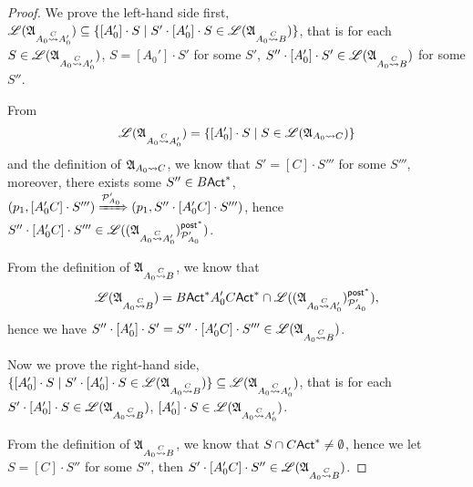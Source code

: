 {\begin{proof}
    We prove the left-hand side first, ${\mathscr{L} }({\mathfrak{A} }_{A_0\stackrel{C}\rightsquigarrow A_0'}) \subseteq \{[A_0']\cdot S \mid S'\cdot [A_0']\cdot S\in{\mathscr{L} }({\mathfrak{A} }_{A_0\stackrel{C}\rightsquigarrow B})\}$, that is for each 
    $S\in{\mathscr{L} }({\mathfrak{A} }_{A_0\stackrel{C}\rightsquigarrow A_0'})$, $S = [A_0']\cdot S'$ for some $S'$, $S''\cdot[A_0']\cdot S'\in{\mathscr{L} }({\mathfrak{A} }_{A_0\stackrel{C}\rightsquigarrow B})$ for some $S''$.

    From 
    $${\mathscr{L} }({\mathfrak{A} }_{A_0\stackrel{C}\rightsquigarrow A_0'}) = \{[A_0']\cdot S\mid S\in {\mathscr{L} }({\mathfrak{A} }_{A_0\rightsquigarrow C})\}$$
    and the definition of ${\mathfrak{A} }_{A_0\rightsquigarrow C}$, we know that $S' = [C]\cdot S'''$ for some $S'''$, 
    moreover, there exists some $S''\in B{\sf Act}^*$, $(p_1,[A_0'C]\cdot S''')\xRightarrow{{\mathcal{P} }_{A_0}'}(p_1, S''\cdot [A_0'C]\cdot S''')$, hence $S''\cdot [A_0'C]\cdot S''' \in {\mathscr{L} }(({\mathfrak{A} }_{A_0\stackrel{C}\rightsquigarrow A_0'})^{{\mathsf{post} }^*}_{{\mathcal{P} }'_{A_0}})$.

    From the definition of ${\mathfrak{A} }_{A_0\stackrel{C}\rightsquigarrow B}$, we know that $${\mathscr{L} }({\mathfrak{A} }_{A_0\stackrel{C}\rightsquigarrow B}) = B{\sf Act}^*A_0'C{\sf Act}^*\cap{\mathscr{L} }(({\mathfrak{A} }_{A_0\stackrel{C}\rightsquigarrow A_0'})^{{\mathsf{post} }^*}_{{\mathcal{P} }'_{A_0}}),$$
    hence we have $S''\cdot[A_0']\cdot S' = S''\cdot[A_0'C]\cdot S''' \in{\mathscr{L} }({\mathfrak{A} }_{A_0\stackrel{C}\rightsquigarrow B})$.

    Now we prove the right-hand side, $\{[A_0']\cdot S \mid S'\cdot [A_0']\cdot S\in{\mathscr{L} }({\mathfrak{A} }_{A_0\stackrel{C}\rightsquigarrow B})\}\subseteq {\mathscr{L} }({\mathfrak{A} }_{A_0\stackrel{C}\rightsquigarrow A_0'})$, that is for each 
    $S'\cdot[A_0']\cdot S\in{\mathscr{L} }({\mathfrak{A} }_{A_0\stackrel{C}\rightsquigarrow B})$, $[A_0']\cdot S\in{\mathscr{L} }({\mathfrak{A} }_{A_0\stackrel{C}\rightsquigarrow A_0'})$.
    

    From the definition of ${\mathfrak{A} }_{A_0\stackrel{C}\rightsquigarrow B}$, we know that $S\cap C{\sf Act}^*\neq\emptyset$, hence we let $S = [C]\cdot S''$ for some $S''$, then $S'\cdot[A_0'C]\cdot S''\in{\mathscr{L} }({\mathfrak{A} }_{A_0\stackrel{C}\rightsquigarrow B})$. 
    

\end{proof}}
